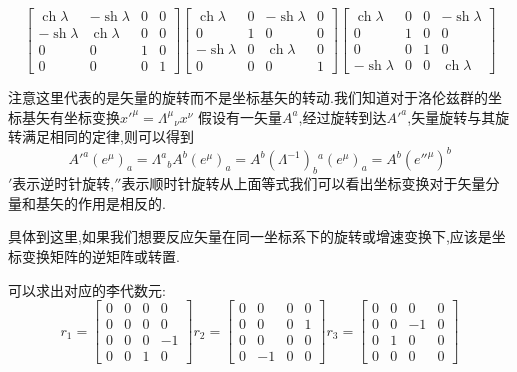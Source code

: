 \documentclass[../main.tex]{subfiles}
\begin{document}
     $$\begin{bmatrix}
     \operatorname{ch} \lambda & -\operatorname{sh} \lambda & 0 & 0 \\
     -\operatorname{sh} \lambda & \operatorname{ch} \lambda & 0 & 0 \\
     0 & 0 & 1 & 0 \\
     0 & 0 & 0 & 1
     \end{bmatrix}
     \begin{bmatrix}
     \operatorname{ch} \lambda & 0 & -\operatorname{sh} \lambda & 0 \\
     0 & 1 & 0 & 0 \\
     -\operatorname{sh} \lambda & 0 & \operatorname{ch} \lambda & 0 \\
     0 & 0 & 0 & 1
     \end{bmatrix}
     \begin{bmatrix}
     \operatorname{ch} \lambda & 0 & 0 & -\operatorname{sh} \lambda \\
     0 & 1 & 0 & 0 \\
     0 & 0 & 1 & 0 \\
     -\operatorname{sh} \lambda & 0 & 0 & \operatorname{ch} \lambda
     \end{bmatrix}$$
     \begin{note}
     注意这里代表的是矢量的旋转而不是坐标基矢的转动.我们知道对于洛伦兹群的坐标基矢有坐标变换$x'^\mu = \Lambda^\mu{}_\nu x^\nu$
     假设有一矢量$A^a$,经过旋转到达$A'^a$,矢量旋转与其旋转满足相同的定律,则可以得到
    $$A'^a(e^\mu)_a = \Lambda^a{}_b A^b(e^\mu)_a= A^b(\Lambda^{-1})_b{}^a(e^\mu)_a= A^b(e''^\mu)^b$$
    $'$表示逆时针旋转,$''$表示顺时针旋转从上面等式我们可以看出坐标变换对于矢量分量和基矢的作用是相反的.

    具体到这里,如果我们想要反应矢量在同一坐标系下的旋转或增速变换下,应该是坐标变换矩阵的逆矩阵或转置.
     \end{note}
     可以求出对应的李代数元:
     $$r_1=\begin{bmatrix}
     0 & 0 & 0 & 0 \\
     0 & 0 & 0 & 0 \\
     0 & 0 & 0 & -1 \\
     0 & 0 & 1 & 0
     \end{bmatrix}
     r_2=\begin{bmatrix}
     0 & 0 & 0 & 0 \\
     0 & 0 & 0 & 1\\
     0 & 0 & 0 & 0 \\
     0 & -1 & 0 & 0
     \end{bmatrix}
     r_3=\begin{bmatrix}
     0 & 0 & 0 & 0 \\
     0 & 0 & -1 & 0 \\
     0 & 1 & 0 & 0 \\
     0 & 0 & 0 & 0
     \end{bmatrix}$$
\end{document}

